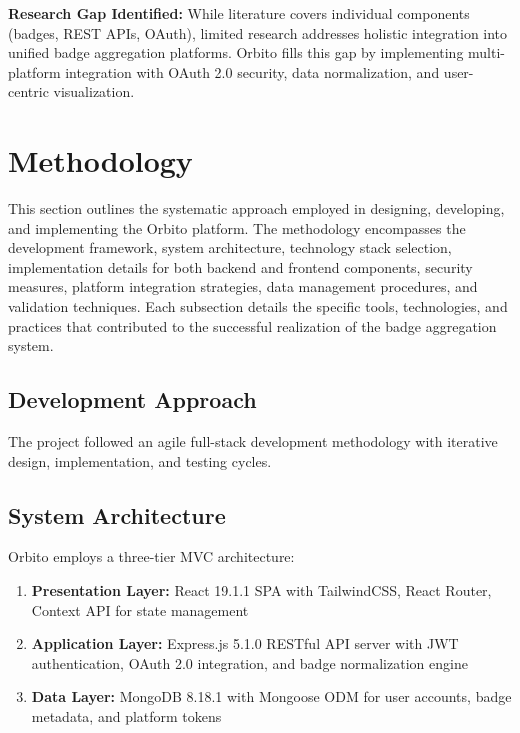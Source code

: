 \documentclass[12pt,a4paper]{article}
\begin{document}
\hypersetup{
    linkcolor=blue,
    urlcolor=blue,
    citecolor=blue
}

\noindent
\textbf{Research Gap Identified:} While literature covers individual components (badges, REST APIs, OAuth), limited research addresses holistic integration into unified badge aggregation platforms. Orbito fills this gap by implementing multi-platform integration with OAuth 2.0 security, data normalization, and user-centric visualization.

\newpage

\section{Methodology}
\justify

This section outlines the systematic approach employed in designing, developing, and implementing the Orbito platform. The methodology encompasses the development framework, system architecture, technology stack selection, implementation details for both backend and frontend components, security measures, platform integration strategies, data management procedures, and validation techniques. Each subsection details the specific tools, technologies, and practices that contributed to the successful realization of the badge aggregation system.

\subsection{Development Approach}
The project followed an agile full-stack development methodology with iterative design, implementation, and testing cycles.

\subsection{System Architecture}

Orbito employs a three-tier MVC architecture:

\begin{enumerate}[leftmargin=*]
    \item \textbf{Presentation Layer:} React 19.1.1 SPA with TailwindCSS, React Router, Context API for state management
    \item \textbf{Application Layer:} Express.js 5.1.0 RESTful API server with JWT authentication, OAuth 2.0 integration, and badge normalization engine
    \item \textbf{Data Layer:} MongoDB 8.18.1 with Mongoose ODM for user accounts, badge metadata, and platform tokens
\end{enumerate}
\end{document}
